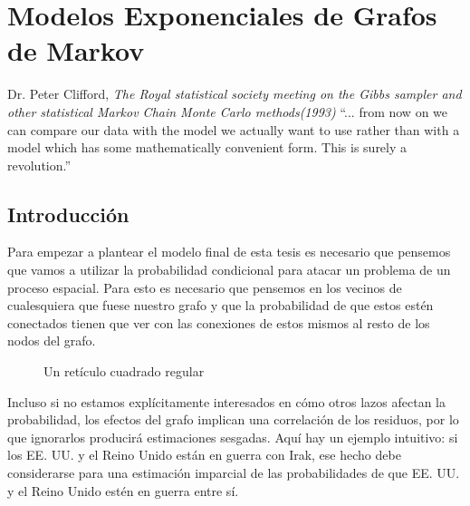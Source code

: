 \chapter{Modelos Exponenciales de Grafos de Markov}
\label{ch:ERGMS}
\begin{chapquote}{Dr. Peter Clifford, \textit{The Royal statistical society meeting on the Gibbs sampler and other statistical Markov Chain Monte Carlo methods(1993)}}
``... from now on we can compare our data with the model we actually want to use rather than with a model which has some mathematically convenient form. This is surely a revolution.''
\end{chapquote}


\section{Introducción}


Para empezar a plantear el modelo final de esta tesis es necesario que pensemos que vamos a utilizar la probabilidad condicional para atacar un problema de un proceso espacial. Para esto es necesario que pensemos en los vecinos de cualesquiera que fuese nuestro grafo y que la probabilidad de que estos estén conectados tienen que ver con las conexiones de estos mismos al resto de los nodos del grafo.

\begin{figure}
    \centering
    \caption{Un retículo cuadrado regular}
    \label{fig:retícula}
\end{figure}



Incluso si no estamos explícitamente interesados en cómo otros lazos afectan la probabilidad, los efectos del grafo implican una correlación de los residuos, por lo que ignorarlos producirá estimaciones sesgadas. Aquí hay un ejemplo intuitivo: si los EE. UU. y el Reino Unido están en guerra con Irak, ese hecho debe considerarse para una estimación imparcial de las probabilidades de que EE. UU. y el Reino Unido estén en guerra entre sí.

